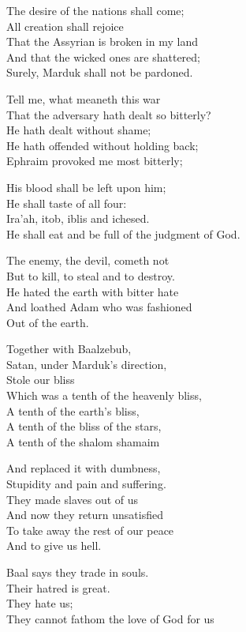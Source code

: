 \documentclass[
]{book}
\begin{document}
The desire of the nations shall come;\\
All creation shall rejoice\\
That the Assyrian is broken in my land\\
And that the wicked ones are shattered;\\
Surely, Marduk shall not be pardoned.

Tell me, what meaneth this war\\
That the adversary hath dealt so bitterly?\\
He hath dealt without shame;\\
He hath offended without holding back;\\
Ephraim provoked me most bitterly;

His blood shall be left upon him;\\
He shall taste of all four:\\
Ira'ah, itob, iblis and ichesed.\\
He shall eat and be full of the judgment of God.

The enemy, the devil, cometh not\\
But to kill, to steal and to destroy.\\
He hated the earth with bitter hate\\
And loathed Adam who was fashioned\\
Out of the earth.

Together with Baalzebub,\\
Satan, under Marduk's direction,\\
Stole our bliss\\
Which was a tenth of the heavenly bliss,\\
A tenth of the earth's bliss,\\
A tenth of the bliss of the stars,\\
A tenth of the shalom shamaim

And replaced it with dumbness,\\
Stupidity and pain and suffering.\\
They made slaves out of us\\
And now they return unsatisfied\\
To take away the rest of our peace\\
And to give us hell.

Baal says they trade in souls.\\
Their hatred is great.\\
They hate us;\\
They cannot fathom the love of God for us
\end{document}
